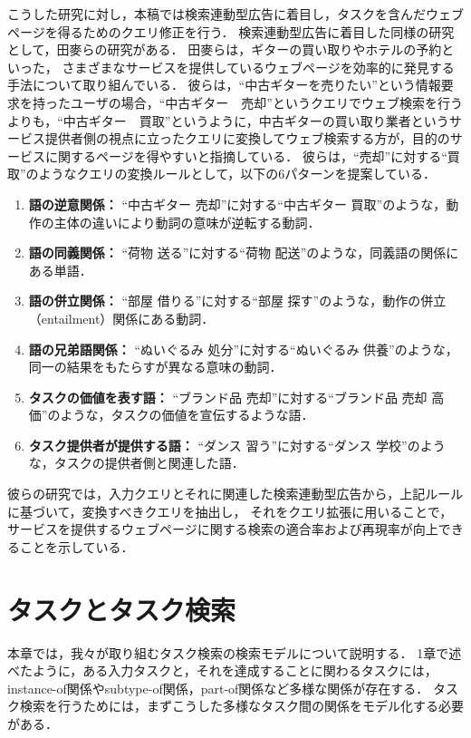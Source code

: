 \documentclass[submit,techreq]{ipsj}
\begin{document}
こうした研究に対し，本稿では検索連動型広告に着目し，タスクを含んだウェブページを得るためのクエリ修正を行う．
検索連動型広告に着目した同様の研究として，田麥らの研究がある\cite{tamugiDEIM}\cite{tamugiDBS}\cite{tamugiMS}．
田麥らは，ギターの買い取りやホテルの予約といった，
さまざまなサービスを提供しているウェブページを効率的に発見する手法について取り組んでいる．
彼らは，``中古ギターを売りたい''という情報要求を持ったユーザの場合，``中古ギター　売却''というクエリでウェブ検索を行うよりも，``中古ギター　買取''というように，中古ギターの買い取り業者というサービス提供者側の視点に立ったクエリに変換してウェブ検索する方が，目的のサービスに関するページを得やすいと指摘している．
彼らは，``売却''に対する``買取''のようなクエリの変換ルールとして，以下の6パターンを提案している．
\begin{enumerate}
\item \textbf{語の逆意関係：} ``中古ギター 売却''に対する``中古ギター 買取''のような，動作の主体の違いにより動詞の意味が逆転する動詞．
\item \textbf{語の同義関係：} ``荷物 送る''に対する``荷物 配送''のような，同義語の関係にある単語．
\item \textbf{語の併立関係：} ``部屋 借りる''に対する``部屋 探す''のような，動作の併立（entailment）関係にある動詞．
\item \textbf{語の兄弟語関係：} ``ぬいぐるみ 処分''に対する``ぬいぐるみ 供養''のような，同一の結果をもたらすが異なる意味の動詞．
\item \textbf{タスクの価値を表す語：} 
``ブランド品 売却''に対する``ブランド品 売却 高価''のような，タスクの価値を宣伝するような語．
\item \textbf{タスク提供者が提供する語：} ``ダンス 習う''に対する``ダンス 学校''のような，タスクの提供者側と関連した語．
\end{enumerate}
彼らの研究では，入力クエリとそれに関連した検索連動型広告から，上記ルールに基づいて，変換すべきクエリを抽出し，
それをクエリ拡張に用いることで，サービスを提供するウェブページに関する検索の適合率および再現率が向上できることを示している．

\section{タスクとタスク検索}
\label{sec:task}

本章では，我々が取り組むタスク検索の検索モデルについて説明する．
1章で述べたように，ある入力タスクと，それを達成することに関わるタスクには，
instance-of関係やsubtype-of関係，part-of関係など多様な関係が存在する．
タスク検索を行うためには，まずこうした多様なタスク間の関係をモデル化する必要がある．
\end{document}

